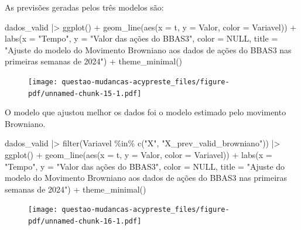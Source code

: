 \documentclass[
  letterpaper,
  DIV=11,
  numbers=noendperiod]{scrreprt}
\newenvironment{Shaded}{\begin{snugshade}}{\end{snugshade}}
\newcommand{\AttributeTok}[1]{\textcolor[rgb]{0.40,0.45,0.13}{#1}}
\newcommand{\ConstantTok}[1]{\textcolor[rgb]{0.56,0.35,0.01}{#1}}
\newcommand{\FunctionTok}[1]{\textcolor[rgb]{0.28,0.35,0.67}{#1}}
\newcommand{\NormalTok}[1]{\textcolor[rgb]{0.00,0.23,0.31}{#1}}
\newcommand{\SpecialCharTok}[1]{\textcolor[rgb]{0.37,0.37,0.37}{#1}}
\newcommand{\StringTok}[1]{\textcolor[rgb]{0.13,0.47,0.30}{#1}}
\begin{document}

As previsões geradas pelos três modelos são:

\begin{Shaded}
\begin{Highlighting}[]
\NormalTok{dados\_valid }\SpecialCharTok{|\textgreater{}}
    \FunctionTok{ggplot}\NormalTok{() }\SpecialCharTok{+}
    \FunctionTok{geom\_line}\NormalTok{(}\FunctionTok{aes}\NormalTok{(}\AttributeTok{x =}\NormalTok{ t, }\AttributeTok{y =}\NormalTok{ Valor, }\AttributeTok{color =}\NormalTok{ Variavel)) }\SpecialCharTok{+}
    \FunctionTok{labs}\NormalTok{(}\AttributeTok{x =} \StringTok{"Tempo"}\NormalTok{,}
         \AttributeTok{y =} \StringTok{"Valor das ações do BBAS3"}\NormalTok{,}
         \AttributeTok{color =} \ConstantTok{NULL}\NormalTok{,}
         \AttributeTok{title =} \StringTok{"Ajuste do modelo do Movimento Browniano aos dados}
\StringTok{          de ações do BBAS3 nas primeiras semanas de 2024"}\NormalTok{) }\SpecialCharTok{+}
    \FunctionTok{theme\_minimal}\NormalTok{()}
\end{Highlighting}
\end{Shaded}

\begin{figure}[H]

{\centering \texttt{[image: questao-mudancas-acypreste\_files/figure-pdf/unnamed-chunk-15-1.pdf]}

}

\end{figure}

O modelo que ajustou melhor os dados foi o modelo estimado pelo
movimento Browniano.

\begin{Shaded}
\begin{Highlighting}[]
\NormalTok{dados\_valid }\SpecialCharTok{|\textgreater{}}
    \FunctionTok{filter}\NormalTok{(Variavel }\SpecialCharTok{\%in\%} \FunctionTok{c}\NormalTok{(}\StringTok{"X"}\NormalTok{, }\StringTok{"X\_prev\_valid\_browniano"}\NormalTok{)) }\SpecialCharTok{|\textgreater{}}
    \FunctionTok{ggplot}\NormalTok{() }\SpecialCharTok{+}
    \FunctionTok{geom\_line}\NormalTok{(}\FunctionTok{aes}\NormalTok{(}\AttributeTok{x =}\NormalTok{ t, }\AttributeTok{y =}\NormalTok{ Valor, }\AttributeTok{color =}\NormalTok{ Variavel)) }\SpecialCharTok{+}
    \FunctionTok{labs}\NormalTok{(}\AttributeTok{x =} \StringTok{"Tempo"}\NormalTok{,}
         \AttributeTok{y =} \StringTok{"Valor das ações do BBAS3"}\NormalTok{,}
         \AttributeTok{color =} \ConstantTok{NULL}\NormalTok{,}
         \AttributeTok{title =} \StringTok{"Ajuste do modelo do Movimento Browniano aos dados}
\StringTok{          de ações do BBAS3 nas primeiras semanas de 2024"}\NormalTok{) }\SpecialCharTok{+}
    \FunctionTok{theme\_minimal}\NormalTok{()}
\end{Highlighting}
\end{Shaded}

\begin{figure}[H]

{\centering \texttt{[image: questao-mudancas-acypreste\_files/figure-pdf/unnamed-chunk-16-1.pdf]}

}

\end{figure}



\printindex
\end{document}
